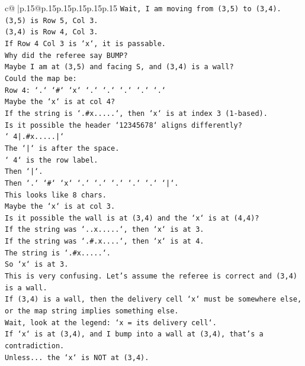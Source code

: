 \documentclass{article}
\begin{document}
{\begin{supertabular}{c@{$\;$}|p{.15\linewidth}@{}p{.15\linewidth}p{.15\linewidth}p{.15\linewidth}p{.15\linewidth}p{.15\linewidth}}
{{{\texttt{Wait, I am moving from (3,5) to (3,4).} \\
\texttt{(3,5) is Row 5, Col 3.} \\
\texttt{(3,4) is Row 4, Col 3.} \\
\texttt{If Row 4 Col 3 is `x`, it is passable.} \\
\texttt{Why did the referee say BUMP?} \\
\texttt{Maybe I am at (3,5) and facing S, and (3,4) is a wall?} \\
\texttt{Could the map be:} \\
\texttt{Row 4: `.` `\#` `x` `.` `.` `.` `.` `.`} \\
\texttt{Maybe the `x` is at col 4?} \\
\texttt{If the string is `.\#x.....`, then `x` is at index 3 (1{-}based).} \\
\texttt{Is it possible the header `12345678` aligns differently?} \\
\texttt{` 4|.\#x.....|`} \\
\texttt{The `|` is after the space.} \\
\texttt{` 4` is the row label.} \\
\texttt{Then `|`.} \\
\texttt{Then `.` `\#` `x` `.` `.` `.` `.` `.` `|`.} \\
\texttt{This looks like 8 chars.} \\
\texttt{Maybe the `x` is at col 3.} \\
\texttt{Is it possible the wall is at (3,4) and the `x` is at (4,4)?} \\
\texttt{If the string was `..x.....`, then `x` is at 3.} \\
\texttt{If the string was `.\#.x....`, then `x` is at 4.} \\
\texttt{The string is `.\#x.....`.} \\
\texttt{So `x` is at 3.} \\
\texttt{This is very confusing. Let's assume the referee is correct and (3,4) is a wall.} \\
\texttt{If (3,4) is a wall, then the delivery cell `x` must be somewhere else, or the map string implies something else.} \\
\texttt{Wait, look at the legend: `x = its delivery cell`.} \\
\texttt{If `x` is at (3,4), and I bump into a wall at (3,4), that's a contradiction.} \\
\texttt{Unless... the `x` is NOT at (3,4).} \\
}}}
\end{supertabular}}
\end{document}
